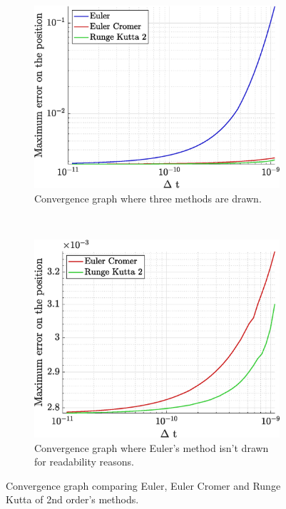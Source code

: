 \documentclass[a4paper,12pt,twoside]{article}
\begin{document}
\begin{figure}[h]
\centering
\begin{subfigure}[t]{0.45\textwidth}
	\includegraphics[width=\textwidth]{graphs/app1_conv_ALL.eps}
	\caption{Convergence graph where three methods are drawn.}
	\label{fig:app1-conv-ALL}
\end{subfigure}
~
\begin{subfigure}[t]{0.45\textwidth}
	\includegraphics[width=\textwidth]{graphs/app1_conv_noEuler.eps}
	\caption{Convergence graph where Euler's method isn't drawn for readability reasons.}
	\label{fig:app1-conv-noEuler}
\end{subfigure}
\caption{Convergence graph comparing Euler, Euler Cromer and Runge Kutta of 2nd order's methods.}
\label{fig:app1-conv}
\end{figure}
\end{document}
